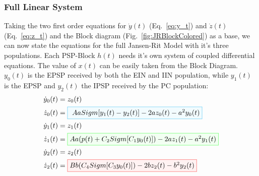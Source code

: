 

\subsubsection{Full Linear System}

Taking the two first order equations for $\dot{y}(t)$ (Eq.~\ref{eq:y_t}) and $\dot{z}(t)$ (Eq.~\ref{eq:z_t})
and the Block diagram (Fig.~\ref{fig:JRBlockColored}) as a base,
we can now state the equations for the full Jansen-Rit Model with it's three populations.
Each PSP-Block $h(t)$ needs it's own system of coupled differential equations.
The value of $x(t)$ can be easily taken from the Block Diagram. $y_0(t)$ is the EPSP received by
both the EIN and IIN population, while $y_1(t)$ is the EPSP and $y_2(t)$ the IPSP received by the PC population:
\begin{equation}
    \begin{aligned}
        \dot{y}_0(t) &= z_0(t) \\
        \dot{z}_0(t) &= \fcolorbox{cyan!80}{cyan!5}{ $ Aa Sigm[y_1(t) - y_2(t)] - 2az_0(t) - a^{2}y_0(t) $}\\
        \dot{y}_1(t) &= z_1(t) \\
        \dot{z}_1(t) &= \fcolorbox{green!80}{green!5}{$ Aa(p(t) + C_{2}Sigm[C_{1}y_0(t)]) - 2az_1(t) - a^{2}y_1(t)$}\\
        \dot{y}_2(t) &= z_2(t) \\
        \dot{z}_2(t) &= \fcolorbox{red!80}{red!5}{$ Bb(C_{4}Sigm[C_{3}y_0(t)]) - 2bz_2(t) -b^{2}y_2(t)$} \\
    \end{aligned}\label{eq:jr_nmm_system}
\end{equation}

